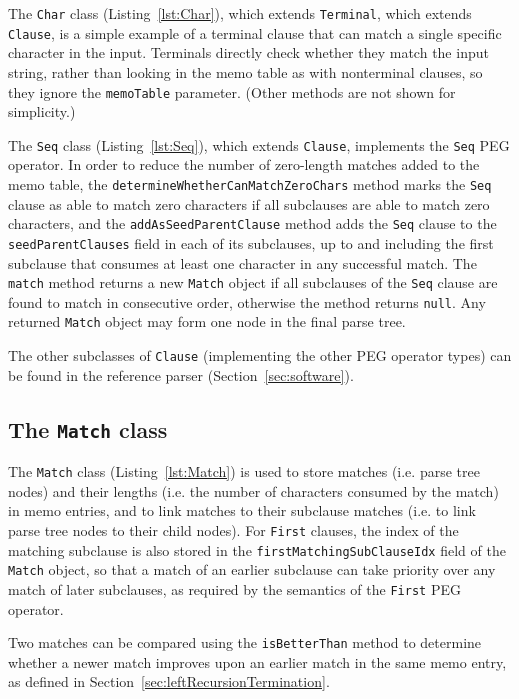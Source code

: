 \documentclass[manuscript,screen]{acmart}
\begin{document}
The \texttt{Char} class (Listing~\ref{lst:Char}), which extends \texttt{Terminal}, which extends \texttt{Clause}, is a simple example of a terminal clause that can match a single specific character in the input. Terminals directly check whether they match the input string, rather than looking in the memo table as with nonterminal clauses, so they ignore the \texttt{memoTable} parameter. (Other methods are not shown for simplicity.)

The \texttt{Seq} class (Listing~\ref{lst:Seq}), which extends \texttt{Clause}, implements the \texttt{Seq} PEG operator. In order to reduce the number of zero-length matches added to the memo table, the \texttt{determineWhetherCanMatchZeroChars} method marks the \texttt{Seq} clause as able to match zero characters if all subclauses are able to match zero characters, and the \texttt{addAsSeedParentClause} method adds the \texttt{Seq} clause to the \texttt{seedParentClauses} field in each of its subclauses, up to and including the first subclause that consumes at least one character in any successful match. The \texttt{match} method returns a new \texttt{Match} object if all subclauses of the \texttt{Seq} clause are found to match in consecutive order, otherwise the method returns \texttt{null}. Any returned \texttt{Match} object may form one node in the final parse tree.

The other subclasses of \texttt{Clause} (implementing the other PEG operator types) can be found in the reference parser (Section~\ref{sec:software}).

\subsection{\label{sec:Match}The \texttt{Match} class}

The \texttt{Match} class (Listing~\ref{lst:Match}) is used to store matches (i.e. parse tree nodes) and their lengths (i.e. the number of characters consumed by the match) in memo entries, and to link matches to their subclause matches (i.e. to link parse tree nodes to their child nodes). For \texttt{First} clauses, the index of the matching subclause is also stored in the \texttt{firstMatchingSubClauseIdx} field of the \texttt{Match} object, so that a match of an earlier subclause can take priority over any match of later subclauses, as required by the semantics of the \texttt{First} PEG operator.

Two matches can be compared using the \texttt{isBetterThan} method to determine whether a newer match improves upon an earlier match in the same memo entry, as defined in Section~\ref{sec:leftRecursionTermination}.
\end{document}
